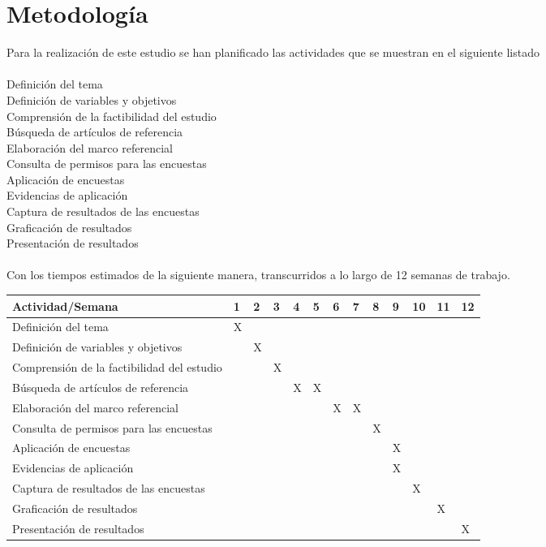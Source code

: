 \documentclass [a4paper, 12pt]{report}
\begin{document}
\section{Metodología}

Para la realización de este estudio se han planificado las actividades que se muestran en el siguiente listado \\
\\
Definición del tema    \\ 
Definición de variables y objetivos            \\ 
Comprensión de la factibilidad del estudio     \\ 
Búsqueda de artículos de referencia     \\ 
Elaboración del marco referencial  \\ 
Consulta de permisos para las encuestas       \\ 
Aplicación de encuestas        \\ 
Evidencias de aplicación     \\ 
Captura de resultados de las encuestas \\
Graficación de resultados     \\
Presentación de resultados \\
\\
Con los tiempos estimados de la siguiente manera, transcurridos a lo largo de 12 semanas de trabajo.
\\
\begin{table*}[h]
			\begin{tabular}{||p{4cm}|l|l|l|l|l|l|l|l|l|l|l|l||}
\hline		
\hline
Actividad/Semana  & 1 & 2 & 3 & 4 & 5 & 6 & 7 & 8 & 9 & 10 & 11 & 12 \\
\hline
Definición del tema & X &   &   &   &   &   &   &   &   &   &   &    \\ \hline
Definición de variables y objetivos           &   & X &   &   &   &   &   &   &   &   &   &    \\ \hline
Comprensión de la factibilidad del estudio     &   &   & X &   &   &   &   &   &   &   &   &    \\ \hline
Búsqueda de artículos de referencia     &   &   &   & X & X &   &   &   &   &   &   &    \\ \hline
Elaboración del marco referencial     &   &   &   &   &   & X & X &   &   &   &   &    \\ \hline
Consulta de permisos para las encuestas     &   &   &   &   &   &   &   & X &   &   &   &    \\ \hline
Aplicación de encuestas     &   &   &   &   &   &   &   &   & X &   &   &    \\ \hline
Evidencias de aplicación      &   &   &   &   &   &   &   &   & X &   &   &    \\ \hline
Captura de resultados de las encuestas      &   &   &   &   &   &   &   &   &   & X &   &    \\ \hline
Graficación de resultados      &   &   &   &   &   &   &   &   &   &   & X &    \\ \hline
Presentación de resultados      &   &   &   &   &   &   &   &   &   &   &   & X  \\
		\hline
		\hline
		\end{tabular}
\end{table*}
\end{document}
